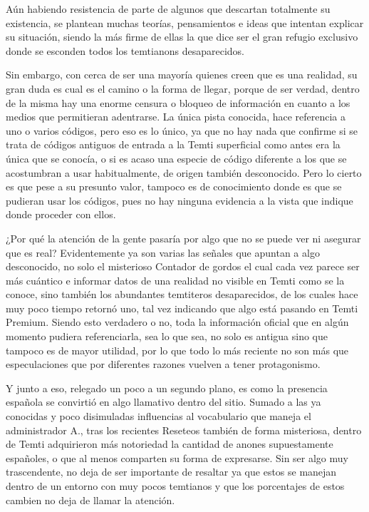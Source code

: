 \documentclass[
]{book}
\begin{document}
Aún habiendo resistencia de parte de algunos que descartan totalmente su existencia, se plantean muchas teorías, pensamientos e ideas que intentan explicar su situación, siendo la más firme de ellas la que dice ser el gran refugio exclusivo donde se esconden todos los temtianons desaparecidos.

Sin embargo, con cerca de ser una mayoría quienes creen que es una realidad, su gran duda es cual es el camino o la forma de llegar, porque de ser verdad, dentro de la misma hay una enorme censura o bloqueo de información en cuanto a los medios que permitieran adentrarse. La única pista conocida, hace referencia a uno o varios códigos, pero eso es lo único, ya que no hay nada que confirme si se trata de códigos antiguos de entrada a la Temti superficial como antes era la única que se conocía, o si es acaso una especie de código diferente a los que se acostumbran a usar habitualmente, de origen también desconocido. Pero lo cierto es que pese a su presunto valor, tampoco es de conocimiento donde es que se pudieran usar los códigos, pues no hay ninguna evidencia a la vista que indique donde proceder con ellos.

¿Por qué la atención de la gente pasaría por algo que no se puede ver ni asegurar que es real? Evidentemente ya son varias las señales que apuntan a algo desconocido, no solo el misterioso Contador de gordos el cual cada vez parece ser más cuántico e informar datos de una realidad no visible en Temti como se la conoce, sino también los abundantes temtiteros desaparecidos, de los cuales hace muy poco tiempo retornó uno, tal vez indicando que algo está pasando en Temti Premium. Siendo esto verdadero o no, toda la información oficial que en algún momento pudiera referenciarla, sea lo que sea, no solo es antigua sino que tampoco es de mayor utilidad, por lo que todo lo más reciente no son más que especulaciones que por diferentes razones vuelven a tener protagonismo.

Y junto a eso, relegado un poco a un segundo plano, es como la presencia española se convirtió en algo llamativo dentro del sitio. Sumado a las ya conocidas y poco disimuladas influencias al vocabulario que maneja el administrador A., tras los recientes Reseteos también de forma misteriosa, dentro de Temti adquirieron más notoriedad la cantidad de anones supuestamente españoles, o que al menos comparten su forma de expresarse. Sin ser algo muy trascendente, no deja de ser importante de resaltar ya que estos se manejan dentro de un entorno con muy pocos temtianos y que los porcentajes de estos cambien no deja de llamar la atención.
\end{document}

